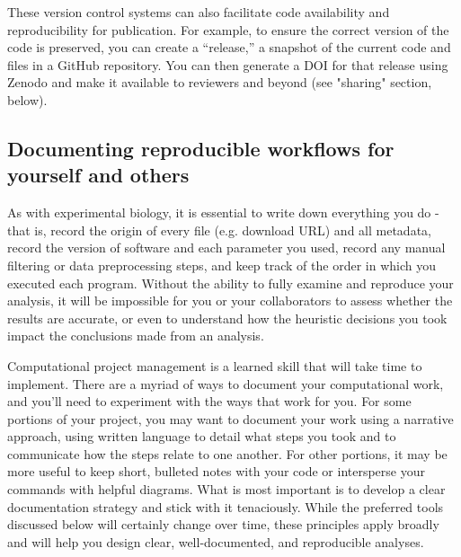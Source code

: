 \documentclass[10pt,letterpaper]{article}
\begin{document}
These version control systems can also facilitate code availability and reproducibility for publication. 
For example, to ensure the correct version of the code is preserved, you can create a “release,” a snapshot of the current code and files in a GitHub repository. 
You can then generate a DOI for that release using Zenodo and make it available to reviewers and beyond (see "sharing" section, below).



\subsection*{Documenting reproducible workflows for yourself and others}

As with experimental biology, it is essential to write down everything you do - that is, record the origin of every file (e.g. download URL) and all metadata, record the version of software and each parameter you used, record any manual filtering or data preprocessing steps, and keep track of the order in which you executed each program. 
Without the ability to fully examine and reproduce your analysis, it will be impossible for you or your collaborators to assess whether the results are accurate, or even to understand how the heuristic decisions you took impact the conclusions made from an analysis. 

Computational project management is a learned skill that will take time to implement. There are a myriad of ways to document your computational work, and you'll need to experiment with the ways that work for you. 
For some portions of your project, you may want to document your work using a narrative approach, using written language to detail what steps you took and to communicate how the steps relate to one another. 
For other portions, it may be more useful to keep short, bulleted notes with your code or intersperse your commands with helpful diagrams. 
What is most important is to develop a clear documentation strategy and stick with it tenaciously. 
While the preferred tools discussed below will certainly change over time, these principles apply broadly and will help you design clear, well-documented, and reproducible analyses.
\end{document}
